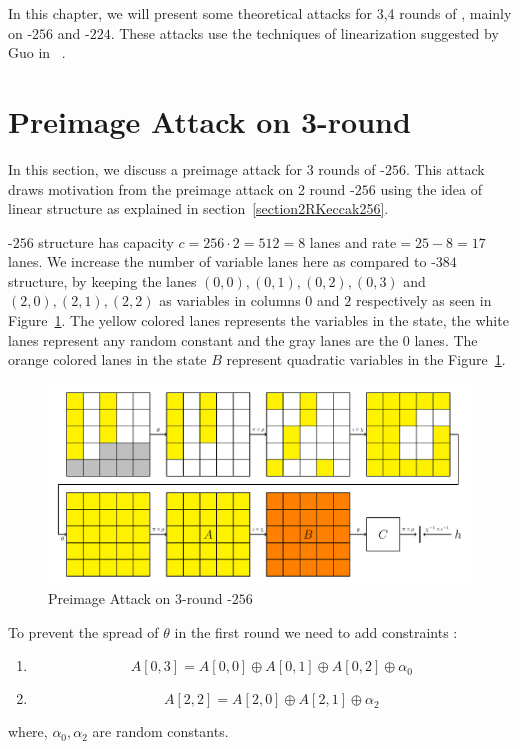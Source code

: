 In this chapter, we will present some theoretical attacks for 3,4 rounds of \KECCAK{}, mainly on \KECCAK{}-$256$ and \KECCAK{}-$224$. These attacks use the techniques of linearization suggested by Guo \etal in ~\cite{guo2016linear}.

\section{Preimage Attack on 3-round }
In this section, we discuss a preimage attack for 3 rounds of \KECCAK-$256$. This attack draws motivation from the preimage attack on 2 round \Keccak-$256$ using the idea of linear structure as explained in section~\ref{section2RKeccak256}.

\Keccak-$256$ structure has capacity $c = 256\cdot2 = 512 = 8$ lanes and rate$ =  25 - 8 = 17$ lanes. We increase the number of variable lanes here as compared to \Keccak-$384$ structure, by keeping the lanes $(0,0), (0,1), (0,2), (0,3)$ and $(2,0), (2,1), (2,2)$ as variables in columns $0$ and $2$ respectively as seen in Figure~\ref{fig:3rkeccak256}. The yellow colored lanes represents the variables in the state, the white lanes represent any random constant and the gray lanes are the $0$ lanes. The orange colored lanes in the state $B$ represent quadratic variables in the Figure~\ref{fig:3rkeccak256}.

\begin{figure}[H]
        \centering
        \includegraphics[scale=0.7]{3Rkeccak256.pdf}
        \caption{Preimage Attack on 3-round \KECCAK-$256$}
        \label{fig:3rkeccak256}
\end{figure}

To prevent the spread of $\theta$ in the first round we need to add constraints :
\begin{enumerate}
\item \[
        A[0,3] = A[0,0] \oplus A[0,1] \oplus A[0, 2] \oplus \alpha_0
    \]
\item \[
        A[2,2] = A[2,0] \oplus A[2,1] \oplus \alpha_2
    \]
\end{enumerate}
where, $\alpha_0, \alpha_2$ are random constants.

